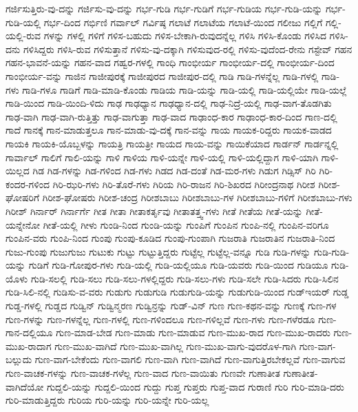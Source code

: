 {ಗರ್ಜಿಸುತ್ತಿರು-ವು-ದನ್ನು
ಗರ್ಜಿಸು-ವು-ದನ್ನು
ಗರ್ಭ-ಗುಡಿ
ಗರ್ಭ-ಗುಡಿಗೆ
ಗರ್ಭ-ಗುಡಿಯ
ಗರ್ಭ-ಗುಡಿ-ಯನ್ನು
ಗರ್ಭ-ಗುಡಿ-ಯಲ್ಲಿ
ಗರ್ಭ-ದಿಂದ
ಗರ್ಭಿಣಿ
ಗರ್ವಾಲ್
ಗರ್ವಿಷ್ಠ
ಗಲಾಟೆ
ಗಲಾಟೆಯ
ಗಲಾಟೆ-ಯಿಂದ
ಗಲೀಜು
ಗಲ್ಲಿಗೆ
ಗಲ್ಲಿ-ಯಲ್ಲಿ-ರುವ
ಗಳನ್ನು
ಗಳಲ್ಲಿ
ಗಳಿಗೆ
ಗಳಿಸ-ಬಹುದು
ಗಳಿಸ-ಬೇಕಾಗಿ-ರುವುದನ್ನೆಲ್ಲ
ಗಳಿಸಿ
ಗಳಿಸಿ-ಕೊಂಡು
ಗಳಿಸಿದ
ಗಳಿಸಿ-ದನು
ಗಳಿಸಿದ್ದರು
ಗಳಿಸಿ-ರುವ
ಗಳಿಸುತ್ತಾನೆ
ಗಳಿಸು-ವು-ದಕ್ಕಾಗಿ
ಗಳಿಸುವುದ-ರಲ್ಲಿ
ಗಳಿಸು-ವುದೆಂದ-ರೇನು
ಗಸ್ಟೇವ್
ಗಹನ
ಗಹನ-ಭಾವನೆ-ಯನ್ನು
ಗಹನ-ವಾದ
ಗಹ್ವರ-ಗಳಲ್ಲಿ
ಗಾಂಧಿ
ಗಾಂಭೀರ್ಯ
ಗಾಂಭೀರ್ಯ-ದಲ್ಲಿ
ಗಾಂಭೀರ್ಯ-ದಿಂದ
ಗಾಂಭೀರ್ಯ-ವನ್ನು
ಗಾಜಿನ
ಗಾಜೀಪುರಕ್ಕೆ
ಗಾಜೀಪುರದ
ಗಾಜೀಪುರ-ದಲ್ಲಿ
ಗಾಡಿ
ಗಾಡಿ-ಗಳನ್ನೆಲ್ಲ
ಗಾಡಿ-ಗಳಲ್ಲಿ
ಗಾಡಿ-ಗಳು
ಗಾಡಿ-ಗಳೂ
ಗಾಡಿಗೆ
ಗಾಡಿ-ಮಾಡಿ-ಕೊಂಡು
ಗಾಡಿಯ
ಗಾಡಿ-ಯನ್ನು
ಗಾಡಿ-ಯಲ್ಲಿ
ಗಾಡಿ-ಯಲ್ಲಿಯೇ
ಗಾಡಿ-ಯಲ್ಲೆ
ಗಾಡಿ-ಯಿಂದ
ಗಾಡಿ-ಯಿಂದಿ-ಳಿದು
ಗಾಢ
ಗಾಢಧ್ಯಾನ
ಗಾಢಧ್ಯಾನ-ದಲ್ಲಿ
ಗಾಢ-ನಿದ್ರೆ-ಯಲ್ಲಿ
ಗಾಢ-ವಾಗ-ತೊಡಗಿತು
ಗಾಢ-ವಾಗಿ
ಗಾಢ-ವಾಗಿ-ರುತ್ತಿತ್ತು
ಗಾಢ-ವಾಗುತ್ತಾ
ಗಾಢ-ವಾದ
ಗಾಢಾಂಧ-ಕಾರ
ಗಾಢಾಂಧ-ಕಾರ-ದಿಂದ
ಗಾಣ-ದಲ್ಲಿ
ಗಾದೆ
ಗಾನಕ್ಕೆ
ಗಾನ-ಮಾಡುತ್ತಲೂ
ಗಾನ-ಮಾಡು-ವು-ದಕ್ಕೆ
ಗಾನ-ವನ್ನು
ಗಾಯ
ಗಾಯಕ-ರಿದ್ದರು
ಗಾಯಕ-ವಾಡದ
ಗಾಯಕಿ
ಗಾಯಕಿ-ಯೊಬ್ಬಳನ್ನು
ಗಾಯತ್ರಿ
ಗಾಯತ್ರೀ
ಗಾಯದ
ಗಾಯ-ವನ್ನು
ಗಾಯಿಕೆಯಾದ
ಗಾರ್ಡನ್
ಗಾರ್ಡನ್ನಲ್ಲಿ
ಗಾರ್ವಾಲ್
ಗಾಲಿಗೆ
ಗಾಲಿ-ಯನ್ನು
ಗಾಳಿ
ಗಾಳಿಯ
ಗಾಳಿ-ಯನ್ನೇ
ಗಾಳಿ-ಯಲ್ಲಿ
ಗಾಳಿ-ಯಲ್ಲಿದ್ದಾಗ
ಗಾಳಿ-ಯಾಗಿ
ಗಾಳಿ-ಯಿಲ್ಲದ
ಗಿಡ
ಗಿಡ-ಗಳನ್ನು
ಗಿಡ-ಗಳಿಂದ
ಗಿಡ-ಗಳು
ಗಿಡದ
ಗಿಡ-ದಂತೆ
ಗಿಡ-ಮರ-ಗಳು
ಗಿಡುಗ
ಗಿಡ್ಸಿಸ್
ಗಿರಿ
ಗಿರಿ-ಕಂದರ-ಗಳಿಂದ
ಗಿರಿ-ಝರಿ-ಗಳು
ಗಿರಿ-ತೊರೆ-ಗಳು
ಗಿರಿಯ
ಗಿರಿ-ರಾಜನ
ಗಿರಿ-ಶಿಖರದ
ಗಿರೀಂದ್ರನಾಥ
ಗಿರೀಶ
ಗಿರೀಶ-ಘೋಷರಿಗೆ
ಗಿರೀಶ-ಘೋಷರು
ಗಿರೀಶ-ಚಂದ್ರ
ಗಿರೀಶಬಾಬು
ಗಿರೀಶಬಾಬು-ಗಳ
ಗಿರೀಶಬಾಬು-ಗಳಿಗೆ
ಗಿರೀಶಬಾಬು-ಗಳು
ಗಿರೀಶ್
ಗಿರ್ನಾರ್
ಗಿರ್ನಾರ್ಗೆ
ಗೀತ
ಗೀತಾ
ಗೀತಾಕರ್ತೃವು
ಗೀತಾತತ್ತ್ವ-ಗಳು
ಗೀತೆ
ಗೀತೆಯ
ಗೀತೆ-ಯನ್ನು
ಗೀತೆ-ಯನ್ನೇನೋ
ಗೀತೆ-ಯಲ್ಲಿ
ಗೀಳು
ಗುಂಡಿ-ನಿಂದ
ಗುಂಡಿ-ಯನ್ನು
ಗುಂಪಿಗೆ
ಗುಂಪಿನ
ಗುಂಪಿ-ನಲ್ಲಿ
ಗುಂಪಿನ-ವರಿಗೂ
ಗುಂಪಿನ-ವರು
ಗುಂಪಿ-ನಿಂದ
ಗುಂಪು
ಗುಂಪು-ಕೂಡಿದ
ಗುಂಪು-ಗುಂಪಾಗಿ
ಗುಜರಾತಿ
ಗುಜರಾತಿನ
ಗುಜರಾತಿ-ನಿಂದ
ಗುಜು-ಗುಂಪು
ಗುಜುಗುಜು
ಗುಟುಕು
ಗುಟ್ಟು
ಗುಟ್ಟುತ್ತಿದ್ದರು
ಗುಟ್ಟೆಲ್ಲ
ಗುಟ್ಟೆಲ್ಲ-ವನ್ನೂ
ಗುಡಿ
ಗುಡಿ-ಗಳನ್ನು
ಗುಡಿ-ಗುಡಿ-ಯನ್ನು
ಗುಡಿಗೆ
ಗುಡಿ-ಗೋಪುರ-ಗಳು
ಗುಡಿ-ಯಲ್ಲಿ
ಗುಡಿ-ಯಲ್ಲಿಯೂ
ಗುಡಿ-ಯವರು
ಗುಡಿ-ಯಿಂದ
ಗುಡಿಯೂ
ಗುಡಿ-ಯೊಳು
ಗುಡಿ-ಸಲಲ್ಲಿ
ಗುಡಿ-ಸಲು
ಗುಡಿ-ಸಲು-ಗಳಲ್ಲಿದ್ದರು
ಗುಡಿ-ಸಲು-ಗಳು
ಗುಡಿ-ಸಲೇ
ಗುಡಿ-ಸಿದರು
ಗುಡಿ-ಸಿಲಿನ
ಗುಡಿ-ಸಿಲಿ-ನಲ್ಲಿ
ಗುಡಿಸು-ವ-ವರು
ಗುಡುಗು
ಗುಡುಗುಡಿ
ಗುಡುಗುಡಿ-ಯನ್ನು
ಗುಡುಗುಡಿ-ಯಿಂದ
ಗುಡ್ಇಯರ್
ಗುಡ್ಡ
ಗುಡ್ಡ-ಗಳಲ್ಲಿ
ಗುಡ್ಡದ
ಗುಡ್ವಿನ್
ಗುಡ್ವಿನ್ಮರಣ
ಗುಡ್ವಿನ್ರನ್ನು
ಗುಡ್-ವಿನ್
ಗುಣ
ಗುಣ-ಕಥನ-ವನ್ನು
ಗುಣಕ್ಕೆ
ಗುಣ-ಗಳ
ಗುಣ-ಗಳನ್ನು
ಗುಣ-ಗಳನ್ನೆಲ್ಲ
ಗುಣ-ಗಳಲ್ಲಿ
ಗುಣ-ಗಳಿಂದಲೂ
ಗುಣ-ಗಳಿಲ್ಲವೆ
ಗುಣ-ಗಳು
ಗುಣ-ಗಳೆರಡೂ
ಗುಣ-ಗಾನ-ದಲ್ಲಿಯೂ
ಗುಣ-ಮಾಡ-ಬೇಡ
ಗುಣ-ಮಾಡು
ಗುಣ-ಮಾಡುವ
ಗುಣ-ಮುಖ-ರಾದ
ಗುಣ-ಮುಖ-ರಾದರು
ಗುಣ-ಮುಖ-ರಾದಾಗ
ಗುಣ-ಮುಖ-ವಾಗಿದೆ
ಗುಣ-ಮುಖ-ವಾಗಿಲ್ಲ
ಗುಣ-ಮುಖ-ವಾಗು-ವುದರೊಳ-ಗಾಗಿ
ಗುಣ-ವಾಗ-ಬಲ್ಲುದು
ಗುಣ-ವಾಗ-ಬೇಕೆಂದು
ಗುಣ-ವಾಗಲಿ
ಗುಣ-ವಾಗಿ
ಗುಣ-ವಾಗಿದೆ
ಗುಣ-ವಾಗುತ್ತಿರಬೇಕಲ್ಲವೆ
ಗುಣ-ವಾಗುವ
ಗುಣ-ವಾಚಕ-ಗಳನ್ನು
ಗುಣ-ವಾಚಕ-ಗಳೆಲ್ಲ
ಗುಣ-ವಾದ
ಗುಣ-ವಾಯಿತು
ಗುಣವೇ
ಗುಣಾತೀತ
ಗುಣಾತೀತ-ವಾಗಿದೆಯೋ
ಗುದ್ದಲಿ-ಯನ್ನು
ಗುದ್ದಲಿ-ಯಿಂದ
ಗುದ್ದು
ಗುಪ್ತ
ಗುಪ್ತರು
ಗುಪ್ತ-ವಾದ
ಗುರಾಣಿ
ಗುರಿ
ಗುರಿ-ಮಾಡಿ-ದರು
ಗುರಿ-ಮಾಡುತ್ತಿದ್ದರು
ಗುರಿಯ
ಗುರಿ-ಯನ್ನು
ಗುರಿ-ಯನ್ನೇ
ಗುರಿ-ಯಲ್ಲ
}
